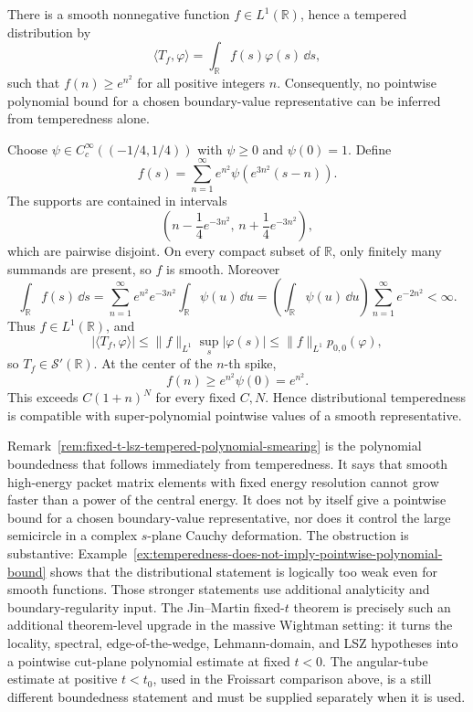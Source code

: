 \begin{example}
\label{ex:temperedness-does-not-imply-pointwise-polynomial-bound}
There is a smooth nonnegative function \(f\in L^1(\mathbb R)\), hence a
tempered distribution by
\[
  \langle T_f,\varphi\rangle=\int_{\mathbb R}f(s)\varphi(s)\,\dd s,
\]
such that \(f(n)\ge e^{n^2}\) for all positive integers \(n\).  Consequently,
no pointwise polynomial bound for a chosen boundary-value representative can
be inferred from temperedness alone.

Choose \(\psi\in C_c^\infty((-1/4,1/4))\) with \(\psi\ge0\) and
\(\psi(0)=1\).  Define
\[
  f(s)=\sum_{n=1}^\infty
  e^{n^2}\psi\!\left(e^{3n^2}(s-n)\right).
\]
The supports are contained in intervals
\[
  \left(n-\frac14e^{-3n^2},\,n+\frac14e^{-3n^2}\right),
\]
which are pairwise disjoint.  On every compact subset of \(\mathbb R\), only
finitely many summands are present, so \(f\) is smooth.  Moreover
\[
  \int_{\mathbb R} f(s)\,\dd s
  =
  \sum_{n=1}^\infty
  e^{n^2}e^{-3n^2}\int_{\mathbb R}\psi(u)\,\dd u
  =
  \left(\int_{\mathbb R}\psi(u)\,\dd u\right)
  \sum_{n=1}^\infty e^{-2n^2}<\infty .
\]
Thus \(f\in L^1(\mathbb R)\), and
\[
  |\langle T_f,\varphi\rangle|
  \le
  \|f\|_{L^1}\sup_s|\varphi(s)|
  \le
  \|f\|_{L^1}p_{0,0}(\varphi),
\]
so \(T_f\in\mathcal S'(\mathbb R)\).  At the center of the \(n\)-th spike,
\[
  f(n)\ge e^{n^2}\psi(0)=e^{n^2}.
\]
This exceeds \(C(1+n)^N\) for every fixed \(C,N\).  Hence distributional
temperedness is compatible with super-polynomial pointwise values of a smooth
representative.
\end{example}

Remark~\ref{rem:fixed-t-lsz-tempered-polynomial-smearing} is the
polynomial boundedness that follows immediately from temperedness.  It says
that smooth high-energy packet matrix elements with fixed energy resolution
cannot grow faster than a power of the central energy.  It does not by itself
give a pointwise
bound for a chosen boundary-value representative, nor does it control the
large semicircle in a complex \(s\)-plane Cauchy deformation.  The obstruction
is substantive: Example~\ref{ex:temperedness-does-not-imply-pointwise-polynomial-bound}
shows that the distributional statement is logically too weak even for smooth
functions.  Those stronger statements use additional analyticity and
boundary-regularity input.  The Jin--Martin fixed-\(t\) theorem is precisely
such an additional theorem-level upgrade in the massive Wightman setting: it
turns the locality, spectral, edge-of-the-wedge, Lehmann-domain, and LSZ
hypotheses into a pointwise cut-plane polynomial estimate at fixed \(t<0\).
The angular-tube estimate at positive \(t<t_0\), used in the Froissart
comparison above, is a still different boundedness statement and must be
supplied separately when it is used.

